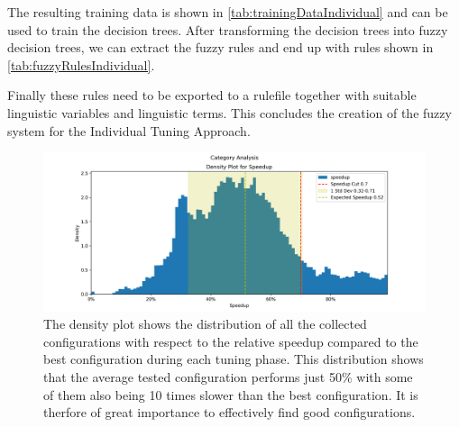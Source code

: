 The resulting training data is shown in \autoref{tab:trainingDataIndividual} and can be used to train the decision trees. After transforming the decision trees into fuzzy decision trees, we can extract the fuzzy rules and end up with rules shown in \autoref{tab:fuzzyRulesIndividual}.

Finally these rules need to be exported to a rulefile together with suitable linguistic variables and linguistic terms. This concludes the creation of the fuzzy system for the Individual Tuning Approach.


\begin{figure}[h]
    \centering
    \includegraphics[width=\columnwidth,trim={1cm 0 2cm 1.5cm},clip]{figures/DataAnalytics/speedup.png}
    \caption[Speedup density plot of all configurations]{The density plot shows the distribution of all the collected configurations with respect to the relative speedup compared to the best configuration during each tuning phase. This distribution shows that the average tested configuration performs just 50\% with some of them also being 10 times slower than the best configuration. It is therfore of great importance to effectively find good configurations.}
    \label{fig:speedup}
\end{figure}


